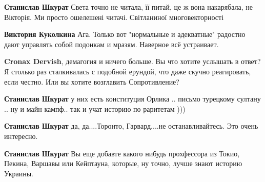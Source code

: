 \begin{itemize}
\begin{itemize}
\textbf{Станислав Шкурат} Света точно не читала, її питай, це ж вона накарябала, не Вікторія. Ми просто ошелешені читачі. Світланиної многовекторності🤣🤣🤣

 
\textbf{Виктория Куколкина} Ага. Только вот "нормальные и адекватные" радостно дают управлять собой подонкам и мразям. Наверное всё устраивает.

 
\textbf{Cronax Dervish}, демагогия и ничего больше. Вы что хотите услышать в ответ? Я столько раз сталкивалась с подобной ерундой, что даже скучно реагировать, если честно. Или вы хотите возглавить Сопротивление?

 
\textbf{Станислав Шкурат} у них есть конституция Орлика .. письмо турецкому султану .. ну и майн кампф.. так и учат историю по раритетам )))

 
\textbf{Станислав Шкурат} да, да....Торонто, Гарвард....не останавливайтесь. Это очень интересно.

 
\textbf{Станислав Шкурат} Вы еще добавте какого нибудь прохфессора из Токио, Пекина, Варшавы или Кейптауна, которые, ну точно, лучше знают историю Украины.

 

\end{itemize}
\end{itemize}
